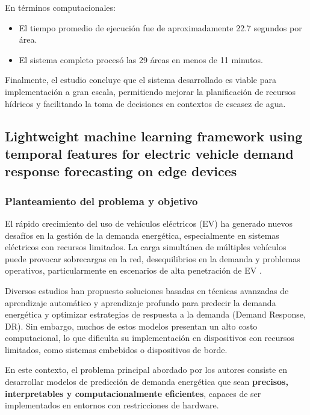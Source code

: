 En términos computacionales:

\begin{itemize}
    \item El tiempo promedio de ejecución fue de aproximadamente 22.7 segundos por área.
    \item El sistema completo procesó las 29 áreas en menos de 11 minutos.
\end{itemize}

Finalmente, el estudio concluye que el sistema desarrollado es viable para implementación a gran escala, permitiendo mejorar la planificación de recursos hídricos y facilitando la toma de decisiones en contextos de escasez de agua.


\subsection{Lightweight machine learning framework using temporal features for electric vehicle demand response forecasting on edge devices \citep{durrani2026ev}}

\subsubsection{Planteamiento del problema y objetivo}

El rápido crecimiento del uso de vehículos eléctricos (EV) ha generado nuevos desafíos en la gestión de la demanda energética, especialmente en sistemas eléctricos con recursos limitados. La carga simultánea de múltiples vehículos puede provocar sobrecargas en la red, desequilibrios en la demanda y problemas operativos, particularmente en escenarios de alta penetración de EV \cite{durrani2026}.

Diversos estudios han propuesto soluciones basadas en técnicas avanzadas de aprendizaje automático y aprendizaje profundo para predecir la demanda energética y optimizar estrategias de respuesta a la demanda (Demand Response, DR). Sin embargo, muchos de estos modelos presentan un alto costo computacional, lo que dificulta su implementación en dispositivos con recursos limitados, como sistemas embebidos o dispositivos de borde.

En este contexto, el problema principal abordado por los autores consiste en desarrollar modelos de predicción de demanda energética que sean \textbf{precisos, interpretables y computacionalmente eficientes}, capaces de ser implementados en entornos con restricciones de hardware.


